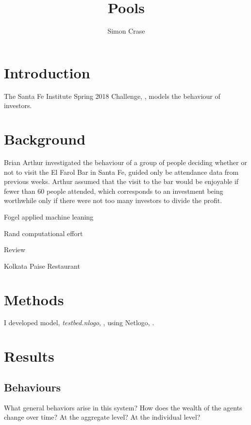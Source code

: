 \documentclass[]{article}
\title{Pools}
\author{Simon Crase}
\begin{document}
\maketitle

\begin{abstract}

\end{abstract}

\section{Introduction}
The Santa Fe Institute Spring 2018 Challenge, \cite{Challenge:2018}, models the behaviour of investors.

\section{Background}


Brian Arthur \cite{arthur1994inductive} investigated the behaviour of a group of people deciding whether or not to visit the El Farol Bar in Santa Fe, guided only be attendance data from previous weeks. Arthur assumed that the visit to the bar would be enjoyable if fewer than 60 people attended, which corresponds to an investment being worthwhile only if there were not too many investors to divide the profit.

Fogel applied machine leaning \cite{fogel1999inductive}

Rand \cite{rand2007farol} computational effort

Review \cite{szabo2007evolutionary}

Kolkata Paise Restaurant \cite{chakrabarti2007kolkata}
\cite{chakrabarti2009kolkata}

\section{Methods}
I developed model, \emph{testbed.nlogo}, \cite{Github:2018}, using Netlogo, \cite{Wilensky:1999}.

\section{Results}

\subsection{Behaviours}What general behaviors arise in this system?  How does the wealth of the agents change over time? At the aggregate level? At the individual level?
\end{document}
